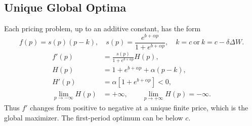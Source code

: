 \documentclass[12pt]{article}
\theoremstyle{definition}
\theoremstyle{remark}
\begin{document}
\subsection{Unique Global Optima}
Each pricing problem, up to an additive constant, has the form
\begin{equation}
 f(p)=s(p)(p-k),\quad s(p)=\frac{e^{b+\alpha p}}{1+e^{b+\alpha p}},
 \quad k=c\ \text{or}\ k=c-\delta\Delta W.
\end{equation}
\begin{align}
 f'(p)&=\frac{s(p)}{1+e^{b+\alpha p}}H(p),\\
 H(p)&=1+e^{b+\alpha p}+\alpha(p-k),\\
 H'(p)&=\alpha[1+e^{b+\alpha p}]<0,\\
 \lim_{p\to-\infty}H(p)&=+\infty,\qquad
 \lim_{p\to+\infty}H(p)=-\infty.
\end{align}
Thus $f'$ changes from positive to negative at a unique finite price,
which is the global maximizer. The first-period optimum can be below $c$.
\end{document}
